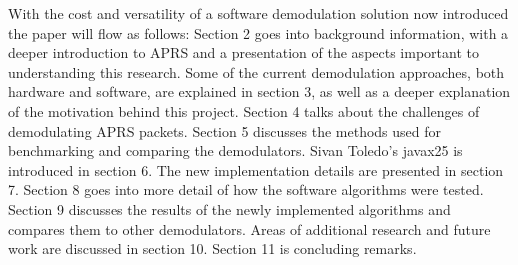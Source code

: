 With the cost and versatility of a software demodulation solution now introduced the paper will flow as follows: Section 2 goes into background information, with a deeper introduction to APRS and a presentation of the aspects important to understanding this research. Some of the current demodulation approaches, both hardware and software, are explained in section 3, as well as a deeper explanation of the motivation behind this project. Section 4 talks about the challenges of demodulating APRS packets. Section 5 discusses the methods used for benchmarking and comparing the demodulators. Sivan Toledo's javax25 is introduced in section 6. The new implementation details are presented in section 7. Section 8 goes into more detail of how the software algorithms were tested. Section 9 discusses the results of the newly implemented algorithms and compares them to other demodulators. Areas of additional research and future work are discussed in section 10. Section 11 is concluding remarks.
